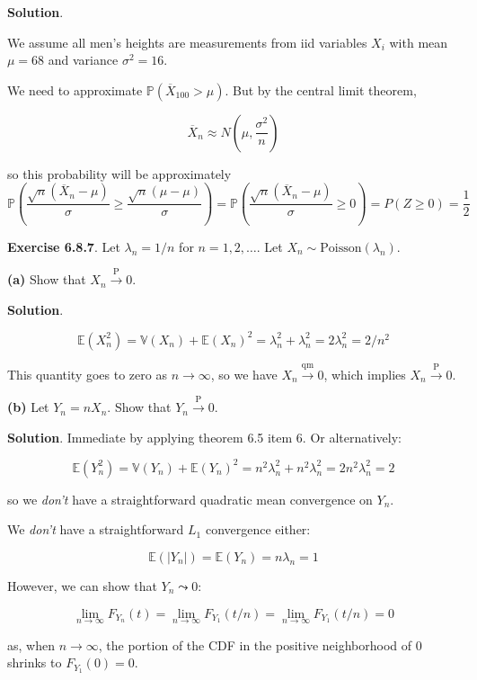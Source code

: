 \textbf{Solution}.

We assume all men's heights are measurements from iid variables \(X_i\)
with mean \(\mu = 68\) and variance \(\sigma^2 = 16\).

We need to approximate \(\mathbb{P}(\overline{X}_{100} > \mu)\). But by
the central limit theorem,

\[ \overline{X}_n \approx N\left(\mu, \frac{\sigma^2}{n}\right) \]

so this probability will be approximately
\[\mathbb{P}\left(\frac{\sqrt{n}(\overline{X}_n - \mu)}{\sigma} \geq \frac{\sqrt{n}(\mu- \mu)}{\sigma}\right) = \mathbb{P}\left(\frac{\sqrt{n}(\overline{X}_n - \mu)}{\sigma} \geq 0 \right) = P(Z \geq 0) = \frac{1}{2}\]

\textbf{Exercise 6.8.7}. Let \(\lambda_n = 1/n\) for
\(n = 1, 2, \dots\). Let \(X_n \sim \text{Poisson}(\lambda_n)\).

\textbf{(a)} Show that \(X_n \xrightarrow{\text{P}} 0\).

\textbf{Solution}.

\[
\mathbb{E}(X_n^2) = \mathbb{V}(X_n) + \mathbb{E}(X_n)^2
= \lambda_n^2 + \lambda_n^2 = 2 \lambda_n^2 = 2/n^2
\]

This quantity goes to zero as \(n \rightarrow \infty\), so we have
\(X_n \xrightarrow{\text{qm}} 0\), which implies
\(X_n \xrightarrow{\text{P}} 0\).

\textbf{(b)} Let \(Y_n = n X_n\). Show that
\(Y_n \xrightarrow{\text{P}} 0\).

\textbf{Solution}. Immediate by applying theorem 6.5 item 6. Or
alternatively:

\[
\mathbb{E}(Y_n^2) = \mathbb{V}(Y_n) + \mathbb{E}(Y_n)^2
= n^2 \lambda_n^2 + n^2\lambda_n^2 = 2 n^2 \lambda_n^2 = 2
\]

so we \emph{don't} have a straightforward quadratic mean convergence on
\(Y_n\).

We \emph{don't} have a straightforward \(L_1\) convergence either:

\[\mathbb{E}(|Y_n|) = \mathbb{E}(Y_n) = n \lambda_n = 1\]

However, we can show that \(Y_n \leadsto 0\):

\[\lim _{n \rightarrow \infty} F_{Y_n}(t) = \lim _{n \rightarrow \infty} F_{Y_1}(t / n) = \lim _{n \rightarrow \infty} F_{Y_1}(t / n) = 0 \]

as, when \(n \rightarrow \infty\), the portion of the CDF in the
positive neighborhood of 0 shrinks to \(F_{Y_1}(0) = 0\).

